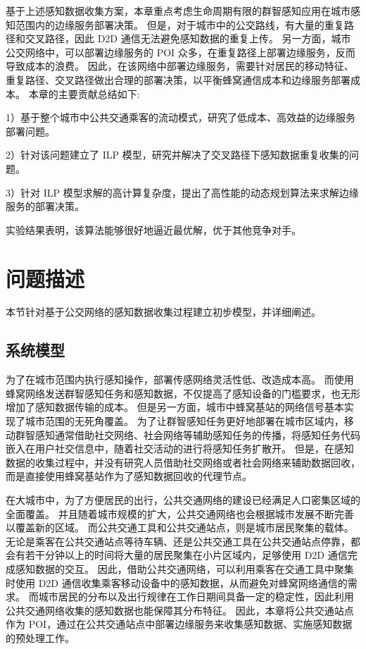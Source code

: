 基于上述感知数据收集方案，本章重点考虑生命周期有限的群智感知应用在城市感知范围内的边缘服务部署决策。
但是，对于城市中的公交路线，有大量的重复路径和交叉路径，因此 D2D 通信无法避免感知数据的重复上传。
另一方面，城市公交网络中，可以部署边缘服务的 POI 众多，在重复路径上部署边缘服务，反而导致成本的浪费。
因此，在该网络中部署边缘服务，需要针对居民的移动特征、重复路径、交叉路径做出合理的部署决策，以平衡蜂窝通信成本和边缘服务部署成本。
本章的主要贡献总结如下:

1）基于整个城市中公共交通乘客的流动模式，研究了低成本、高效益的边缘服务部署问题。

2）针对该问题建立了 ILP 模型，研究并解决了交叉路径下感知数据重复收集的问题。

3）针对 ILP 模型求解的高计算复杂度，提出了高性能的动态规划算法来求解边缘服务的部署决策。

实验结果表明，该算法能够很好地逼近最优解，优于其他竞争对手。



\section{问题描述}
\label{Sec_Monet_question}

本节针对基于公交网络的感知数据收集过程建立初步模型，并详细阐述。

\subsection{系统模型}

为了在城市范围内执行感知操作，部署传感网络灵活性低、改造成本高。
而使用蜂窝网络发送群智感知任务和感知数据，不仅提高了感知设备的门槛要求，也无形增加了感知数据传输的成本。
但是另一方面，城市中蜂窝基站的网络信号基本实现了城市范围的无死角覆盖。
为了让群智感知任务更好地部署在城市区域内，移动群智感知通常借助社交网络、社会网络等辅助感知任务的传播，将感知任务代码嵌入在用户社交信息中，随着社交活动的进行将感知任务扩散开。
但是，在感知数据的收集过程中，并没有研究人员借助社交网络或者社会网络来辅助数据回收，而是直接使用蜂窝基站作为了感知数据回收的代理节点。

在大城市中，为了方便居民的出行，公共交通网络的建设已经满足人口密集区域的全面覆盖。
并且随着城市规模的扩大，公共交通网络也会根据城市发展不断完善以覆盖新的区域。
而公共交通工具和公共交通站点，则是城市居民聚集的载体。
无论是乘客在公共交通站点等待车辆、还是公共交通工具在公共交通站点停靠，都会有若干分钟以上的时间将大量的居民聚集在小片区域内，足够使用 D2D 通信完成感知数据的交互。
因此，借助公共交通网络，可以利用乘客在交通工具中聚集时使用 D2D 通信收集乘客移动设备中的感知数据，从而避免对蜂窝网络通信的需求。
而城市居民的分布以及出行规律在工作日期间具备一定的稳定性，因此利用公共交通网络收集的感知数据也能保障其分布特征。
因此，本章将公共交通站点作为 POI，通过在公共交通站点中部署边缘服务来收集感知数据、实施感知数据的预处理工作。

